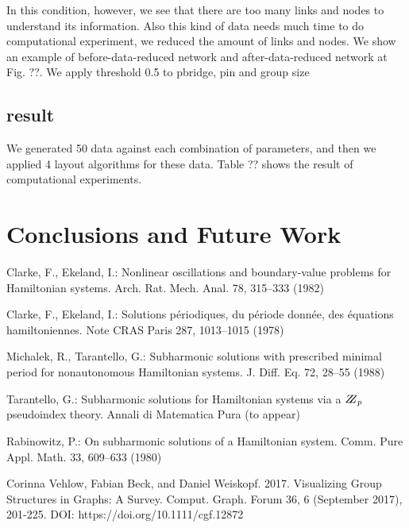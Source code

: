 \documentclass{llncs}
\begin{document}
In this condition, however, we see that there are too many links and nodes to understand its information. Also this kind of data needs much time to do computational experiment, we reduced the amount of links and nodes. We show an example of before-data-reduced network and after-data-reduced network at Fig. ??. We apply threshold 0.5 to pbridge, pin and group size 

\subsection{result}
We generated 50 data against each combination of parameters, and then we applied 4 layout algorithms for these data. Table ?? shows the result of computational experiments.

%
\section{Conclusions and Future Work}
%

%
%
\begin{thebibliography}{5}
%
Clarke, F., Ekeland, I.:
Nonlinear oscillations and
boundary-value problems for Hamiltonian systems.
Arch. Rat. Mech. Anal. 78, 315--333 (1982)

Clarke, F., Ekeland, I.:
Solutions p\'{e}riodiques, du
p\'{e}riode donn\'{e}e, des \'{e}quations hamiltoniennes.
Note CRAS Paris 287, 1013--1015 (1978)

Michalek, R., Tarantello, G.:
Subharmonic solutions with prescribed minimal
period for nonautonomous Hamiltonian systems.
J. Diff. Eq. 72, 28--55 (1988)

Tarantello, G.:
Subharmonic solutions for Hamiltonian
systems via a $\bbbz_{p}$ pseudoindex theory.
Annali di Matematica Pura (to appear)

Rabinowitz, P.:
On subharmonic solutions of a Hamiltonian system.
Comm. Pure Appl. Math. 33, 609--633 (1980)

Corinna Vehlow, Fabian Beck, and Daniel Weiskopf. 2017. Visualizing Group Structures in Graphs: A Survey. Comput. Graph. Forum 36, 6 (September 2017), 201-225. DOI: https://doi.org/10.1111/cgf.12872

\end{thebibliography}
\end{document}
